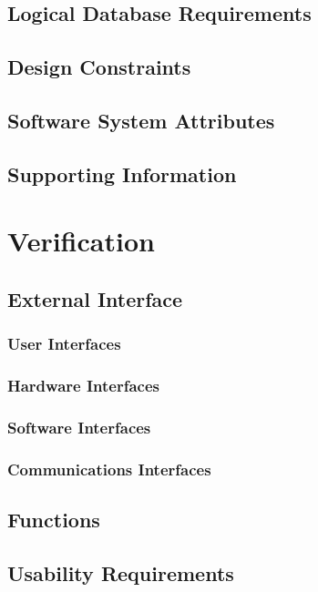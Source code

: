 \documentclass[ 10pt]{report}
\begin{document}
        \section{Logical Database Requirements}
        \section{Design Constraints}
        \section{Software System Attributes}
        \section{Supporting Information}
    \pagebreak

    \chapter{Verification}
        \section{External Interface}
            \subsection{User Interfaces}
            \subsection{Hardware Interfaces}
            \subsection{Software Interfaces}
            \subsection{Communications Interfaces}
        \section{Functions}
        \section{Usability Requirements}
\end{document}
